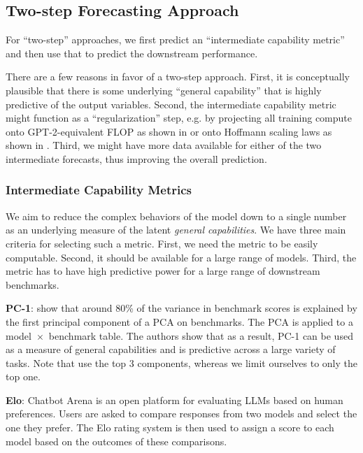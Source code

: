 \subsection{Two-step Forecasting Approach}
For ``two-step'' approaches, we first predict an ``intermediate capability metric'' and then use that to predict the downstream performance.

There are a few reasons in favor of a two-step approach. First, it is conceptually plausible that there is some underlying ``general capability'' that is highly predictive of the output variables. 
Second, the intermediate capability metric might function as a ``regularization'' step, e.g. by projecting all training compute onto GPT-2-equivalent FLOP as shown in \citet{ruan2024observational} or onto Hoffmann scaling laws as shown in \citep{owen2024predictablelanguagemodelbenchmark}.
Third, we might have more data available for either of the two intermediate forecasts, thus improving the overall prediction.

\subsubsection{Intermediate Capability Metrics}
\label{subsec:capability_metrics}

We aim to reduce the complex behaviors of the model down to a single number as an underlying measure of the latent \emph{general capabilities}. We have three main criteria for selecting such a metric. First, we need the metric to be easily computable. Second, it should be available for a large range of models. Third, the metric has to have high predictive power for a large range of downstream benchmarks.

\textbf{PC-1}: \citet{ruan2024observational} show that around 80\% of the variance in benchmark scores is explained by the first principal component of a PCA on benchmarks. The PCA is applied to a model~$\times$~benchmark table. The authors show that as a result, PC-1 can be used as a measure of general capabilities and is predictive across a large variety of tasks. Note that \citet{ruan2024observational} use the top 3 components, whereas we limit ourselves to only the top one.

\textbf{Elo}: Chatbot Arena \citep{chatbot_arena} is an open platform for evaluating LLMs based on human preferences. Users are asked to compare responses from two models and select the one they prefer. The Elo rating system is then used to assign a score to each model based on the outcomes of these comparisons.

